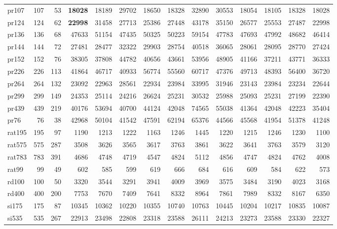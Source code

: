{\begin{longtable}{l r r r r r r r r r r r r r}
pr107 & 107 & 53 & \textbf{18028} & 18189 & 29702 & 18650 & 18328 & 32890 & 30553 & 18054 & 18105 & 18328 & 18028 \\
pr124 & 124 & 62 & \textbf{22998} & 31458 & 27713 & 25386 & 27448 & 43178 & 35150 & 26577 & 25553 & 27487 & 22998 \\
pr136 & 136 & 68 & 47633 & 51154 & 47435 & 50325 & 50223 & 59154 & 47783 & 47693 & 47992 & 48682 & 46414 \\
pr144 & 144 & 72 & 27481 & 28477 & 32322 & 29903 & 28754 & 40518 & 36065 & 28061 & 28095 & 28770 & 27424 \\
pr152 & 152 & 76 & 38305 & 37808 & 44782 & 40656 & 43661 & 53956 & 48905 & 41166 & 37211 & 43771 & 36333 \\
pr226 & 226 & 113 & 41864 & 46717 & 40933 & 56774 & 55560 & 60717 & 47376 & 49713 & 48393 & 56400 & 36720 \\
pr264 & 264 & 132 & 23092 & 22963 & 28561 & 22934 & 23984 & 33995 & 31946 & 23143 & 23984 & 23234 & 22644 \\
pr299 & 299 & 149 & 24353 & 25114 & 24216 & 26624 & 25231 & 30532 & 25988 & 25093 & 25231 & 27199 & 22390 \\
pr439 & 439 & 219 & 40176 & 53694 & 40700 & 44124 & 42048 & 74565 & 55038 & 41364 & 42048 & 42223 & 35404 \\
pr76 & 76 & 38 & 42968 & 50104 & 41542 & 47591 & 62194 & 65376 & 44566 & 45568 & 41954 & 51378 & 41248 \\
rat195 & 195 & 97 & 1190 & 1213 & 1222 & 1163 & 1246 & 1445 & 1220 & 1215 & 1246 & 1230 & 1100 \\
rat575 & 575 & 287 & 3508 & 3626 & 3565 & 3617 & 3763 & 3861 & 3622 & 3641 & 3763 & 3579 & 3120 \\
rat783 & 783 & 391 & 4686 & 4748 & 4719 & 4547 & 4824 & 5112 & 4856 & 4747 & 4824 & 4762 & 4008 \\
rat99 & 99 & 49 & 602 & 585 & 599 & 619 & 666 & 684 & 616 & 609 & 584 & 622 & 573 \\
rd100 & 100 & 50 & 3320 & 3544 & 3291 & 3941 & 4009 & 3969 & 3575 & 3484 & 3190 & 4023 & 3168 \\
rd400 & 400 & 200 & 7753 & 7670 & 7409 & 7641 & 8332 & 8964 & 7861 & 7989 & 8332 & 8167 & 6350 \\
si175 & 175 & 87 & 10345 & 10362 & 10220 & 10355 & 10740 & 10763 & 10445 & 10204 & 10217 & 10835 & 10087 \\
si535 & 535 & 267 & 22913 & 23498 & 22808 & 23318 & 23588 & 26111 & 24213 & 23273 & 23588 & 23330 & 22327 \\

\end{longtable}}
